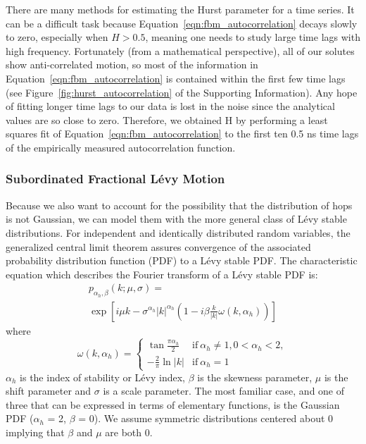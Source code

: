 \documentclass[journal=ancac3,manuscript=article,layout=twocolumn]{achemso}
\begin{document}
  There are many methods for estimating the Hurst parameter for a time series.
  \cite{clegg_practical_2006} It can be a difficult task because 
  Equation~\ref{eqn:fbm_autocorrelation} decays slowly to zero, especially when 
  $H > 0.5$, meaning one needs to study large time lags with high frequency.
  Fortunately (from a mathematical perspective), all of our solutes show anti-correlated motion, so most of the information in
  Equation~\ref{eqn:fbm_autocorrelation} is contained within the first few time lags (see 
  Figure~\ref{fig:hurst_autocorrelation} of the Supporting Information). Any hope of
  fitting longer time lags to our data is lost in the noise since the analytical values
  are so close to zero. Therefore, we obtained H by performing a least squares fit of 
  Equation~\ref{eqn:fbm_autocorrelation} to the first 
  ten 0.5 ns time lags of the empirically measured autocorrelation function.

  \subsubsection{Subordinated Fractional L\'evy Motion}\label{method:sflm}

  Because we also want to account for the possibility that the distribution of
  hops is not Gaussian, we can model them with the more general class of L\'evy
  stable distributions. For independent and identically distributed random
  variables, the generalized central limit theorem assures convergence of the
  associated probability distribution function (PDF) to a L\'evy stable PDF.
  \cite{klages_anomalous_2008} The characteristic equation which describes the
  Fourier transform of a L\'evy stable PDF is: 
  \begin{equation}
  \begin{split}
    p_{\alpha_h, \beta}(k;\mu,\sigma) =~~~~~~~~~~~~~~~~~~~~~~~~~~~~~~~~~~~~~~~~~~~~~ \\
    \exp\left[i\mu k - \sigma^{\alpha_h}|k|^{\alpha_h}\left(1 - i\beta\frac{k}{|k|}\omega(k, \alpha_h)\right)\right]
  \end{split}
  \end{equation}
  where \\
  \[\omega(k, \alpha_h) = \begin{cases}
  	\tan{\frac{\pi \alpha_h}{2}} & \text{if}~\alpha_h \neq 1, 0 < \alpha_h < 2, \\
  	-\frac{2}{\pi}\ln |k| & \text{if}~\alpha_h = 1
  	 \end{cases}
  \]
  $\alpha_h$ is the index of stability or L\'evy index, $\beta$ is the skewness 
  parameter, $\mu$ is the shift parameter and $\sigma$ is a scale parameter. The most
  familiar case, and one of three that can be expressed in terms of elementary functions,
  is the Gaussian PDF ($\alpha_h$ = 2, $\beta$ = 0). We assume symmetric distributions
  centered about 0 implying that $\beta$ and $\mu$ are both 0.
  
\end{document}
